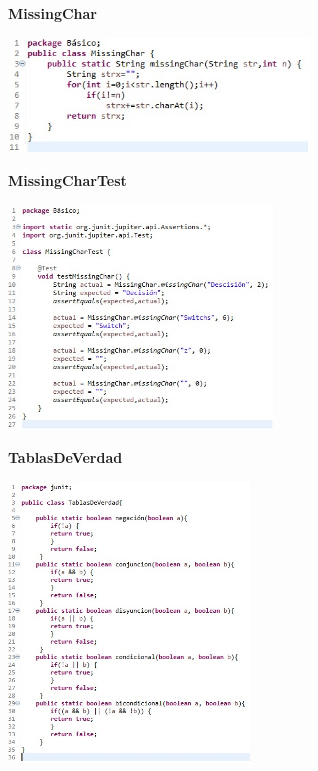 \documentclass[11pt]{beamer}
\begin{document}

\begin{frame}{\textbf{MissingChar}}

\begin{center}
\includegraphics[width=8.0cm]{img/Ejemplo2.jpeg}
\end{center}

\end{frame}


\begin{frame}{\textbf{MissingCharTest}}

\begin{center}
\includegraphics[width=7.0cm]{img/Prueba2.jpeg}
\end{center}

\end{frame}


\begin{frame}{\textbf{TablasDeVerdad}}

\begin{center}
\includegraphics[width=6.4cm]{img/Ejemplo3.jpg}
\end{center}

\end{frame}
\end{document}
